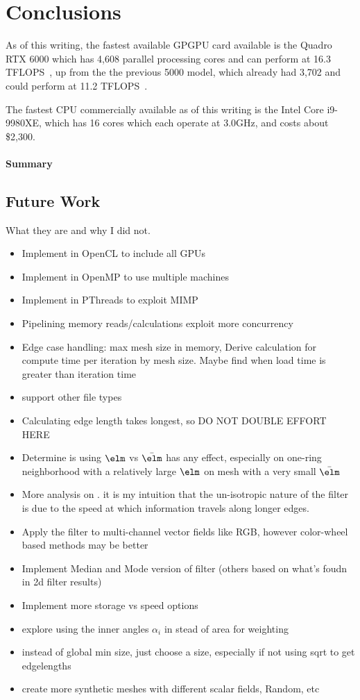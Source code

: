 \chapter{Conclusions}
As of this writing, the fastest available GPGPU card available is the Quadro RTX 6000 which has 4,608 parallel processing cores and can perform at 16.3 TFLOPS~\cite{quadro6k}, up from the the previous 5000 model, which already had 3,702 and could perform at 11.2 TFLOPS~\cite{quadro5k}.

The fastest CPU commercially available as of this writing is the Intel Core i9-9980XE, which has 16 cores which each operate at 3.0GHz, and costs about \$2,300.

%
%
%
%
\subsubsection{Summary}

%
%
%
%
\section{Future Work}
What they are and why I did not.
\begin{itemize}
	\item Implement in OpenCL to include all GPUs
	\item Implement in OpenMP to use multiple machines
	\item Implement in PThreads to exploit MIMP
	\item Pipelining memory reads/calculations exploit more concurrency
	\item Edge case handling: max mesh size in memory, Derive calculation for compute time per iteration by mesh size. Maybe find when load time is greater than iteration time
	\item support other file types
	\item Calculating edge length takes longest, so DO NOT DOUBLE EFFORT HERE
	\item Determine is using $\elm$ vs $\bar{\elm}$ has any effect, especially on one-ring neighborhood with a relatively large $\elm$ on mesh with a very small $\bar{\elm}$
	\item More analysis on \fors. it is my intuition that the un-isotropic nature of the filter is due to the speed at which information travels along longer edges.
	\item Apply the filter to multi-channel vector fields like RGB, however color-wheel based methods may be better
	\item Implement Median and Mode version of filter (others based on what's foudn in 2d filter results)
	\item Implement more storage vs speed options
	\item explore using the inner angles $\alpha_i$ in stead of area for weighting
	\item instead of global min size, just choose a size, especially if not using sqrt to get edgelengths
	\item create more synthetic meshes with different scalar fields, Random, etc
\end{itemize}

